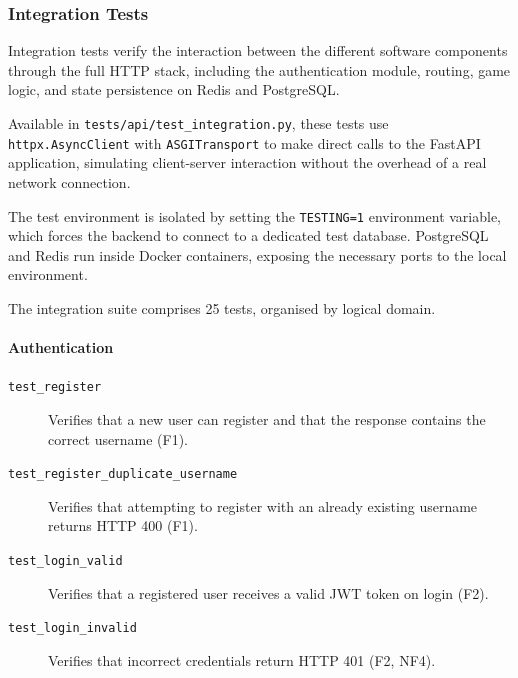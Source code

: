 \documentclass{scrartcl}
\begin{document}
\subsubsection*{Integration Tests}

Integration tests verify the interaction between the different software
components through the full HTTP stack, including the authentication module,
routing, game logic, and state persistence on Redis and PostgreSQL.

Available in \texttt{tests/api/test\_integration.py}, these tests use
\texttt{httpx.AsyncClient} with \texttt{ASGITransport} to make direct calls
to the FastAPI application, simulating client-server interaction without
the overhead of a real network connection.

The test environment is isolated by setting the \texttt{TESTING=1} environment
variable, which forces the backend to connect to a dedicated test database.
PostgreSQL and Redis run inside Docker containers, exposing the necessary
ports to the local environment.

The integration suite comprises 25 tests, organised by logical domain.

\paragraph{Authentication}
\begin{description}
  \item[\texttt{test\_register}] Verifies that a new user can register and
  that the response contains the correct username (F1).

  \item[\texttt{test\_register\_duplicate\_username}] Verifies that attempting
  to register with an already existing username returns HTTP 400 (F1).

  \item[\texttt{test\_login\_valid}] Verifies that a registered user receives
  a valid JWT token on login (F2).

  \item[\texttt{test\_login\_invalid}] Verifies that incorrect credentials
  return HTTP 401 (F2, NF4).
\end{description}
\end{document}
